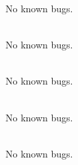\begin{DoxyRefList}
\label{bug__bug000042}%
%
No known bugs.  
\item[File \doxylink{unit_8cpp}{unit.cpp} ]\hfill \\
\label{bug__bug000086}%
%
No known bugs.  
\item[File \doxylink{unit_8hpp}{unit.hpp} ]\hfill \\
\label{bug__bug000043}%
%
No known bugs.  
\item[File \doxylink{_var_eqn_8cpp}{Var\+Eqn.cpp} ]\hfill \\
\label{bug__bug000087}%
%
No known bugs.  
\item[File \doxylink{_var_eqn_8hpp}{Var\+Eqn.hpp} ]\hfill \\
\label{bug__bug000044}%
%
No known bugs. 
\end{DoxyRefList}